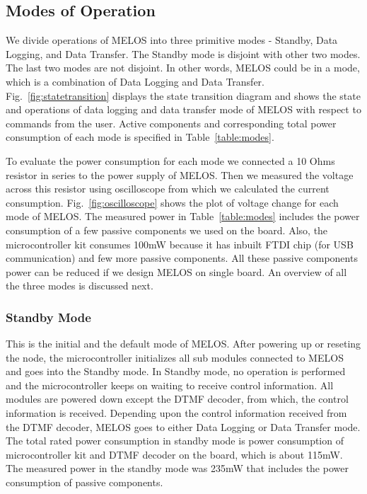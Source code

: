 \documentclass[10pt]{sigplan-proc-varsize}
\newcommand{\tabref}[1]{Table~\ref{#1}}
\newcommand{\figref}[1]{Fig.~\ref{#1}}
\newcommand{\melos}{MELOS }
\newcommand{\melosnospace}{MELOS}
\begin{document}
\subsection{Modes of Operation}
We divide operations of \melos into three primitive modes - Standby, Data Logging, and Data Transfer. The Standby mode is disjoint with other two modes. The last two modes are not disjoint. In other words, \melos could be in a mode, which is a combination of Data Logging and Data Transfer. \figref{fig:statetransition} displays the state transition diagram and shows the state and operations of data logging and data transfer mode of \melos with respect to commands from the user. Active components and corresponding total power consumption of each mode is specified  in \tabref{table:modes}. 




{}
To evaluate the power consumption for each mode we connected a 10 Ohms resistor in series to the power supply of \melosnospace. Then we measured the voltage across this resistor using oscilloscope from which we calculated the current consumption. \figref{fig:oscilloscope} shows the plot of voltage change for each mode of \melosnospace. The measured power in  \tabref{table:modes} includes the power consumption of a few passive components we used on the board. Also, the microcontroller kit consumes 100mW because it has inbuilt FTDI chip (for USB communication) and few more passive components. All these passive components power can be reduced if we design \melos on single board. An overview of all the three modes is discussed next.  

\begin{figure*}
\centering
{}
\caption{Voltage readings from oscilloscope for different modes of operation of \melosnospace.}
\label{fig:oscilloscope}
\vspace{-5mm}
\end{figure*}

\subsubsection{Standby Mode}
This is the initial and the default mode of \melosnospace. After powering up or reseting the node, the microcontroller initializes all sub modules connected to \melos and goes into the Standby mode. In Standby mode, no operation is performed and the microcontroller keeps on waiting to receive control information. All modules are powered down except the DTMF decoder, from which, the control information is received. Depending upon the control information received from the DTMF decoder, \melos goes to either Data Logging or Data Transfer mode. The total rated power consumption in standby mode is power consumption of microcontroller kit and DTMF decoder on the board, which is about 115mW. The measured power in the standby mode was 235mW that includes the power consumption of passive components.
\end{document}
